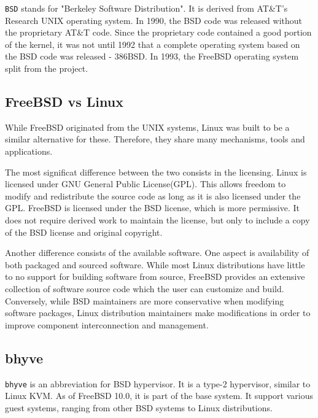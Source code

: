 
\texttt{BSD} stands for "Berkeley Software Distribution". It is derived from AT\&T's Research UNIX operating system. In 1990, the BSD code was released without the proprietary AT\&T code.
Since the proprietary code contained a good portion of the kernel, it was not until 1992 that a complete operating system based on the BSD code was released - 386BSD. In 1993, the FreeBSD operating system split from the project\cite{bsd}. 

\subsection{FreeBSD vs Linux}
\label{subsec:bsdlinux}

While FreeBSD originated from the UNIX systems, Linux was built to be a similar alternative for these. Therefore, they share many mechanisms, tools and applications.

The most significat difference between the two consists in the licensing. Linux is licensed under GNU General Public License(GPL)\cite{gnu}. This allows freedom to modify and redistribute the source code as long as it is also licensed under the GPL. FreeBSD is licensed under the BSD license, which is more permissive. It does not require derived work to maintain the license, but only to include a copy of the BSD license and original copyright\cite{bsd-license}.

Another difference consists of the available software. One aspect is availability of both packaged and sourced software. While most Linux distributions have little to no support for building software from source, FreeBSD provides an extensive collection of software source code which the user can customize and build. Conversely, while BSD maintainers are more conservative when modifying software packages, Linux distribution maintainers make modifications in order to improve component interconnection and management\cite{comp-bsd-linux}.

\subsection{bhyve}
\label{subsec:bhyve}

\texttt{bhyve} is an abbreviation for BSD hypervisor. It is a type-2 hypervisor, similar to Linux KVM. As of FreeBSD 10.0, it is part of the base system. It support various guest systems, ranging from other BSD systems to Linux distributions\cite{intr-bhyve}.

